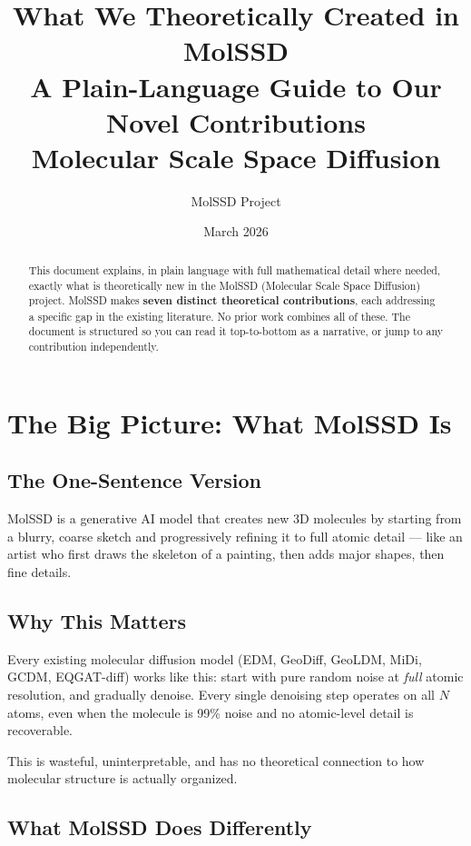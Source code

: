 \documentclass[12pt,a4paper]{article}
\title{%
  \vspace{-1cm}
  {\LARGE\textbf{What We Theoretically Created in MolSSD}}\\[0.5em]
  {\large A Plain-Language Guide to Our Novel Contributions}\\[0.3em]
  {\normalsize Molecular Scale Space Diffusion}
}
\author{MolSSD Project}
\date{March 2026}
\begin{document}
\maketitle

\begin{abstract}
This document explains, in plain language with full mathematical detail where needed, exactly what is theoretically new in the MolSSD (Molecular Scale Space Diffusion) project. MolSSD makes \textbf{seven distinct theoretical contributions}, each addressing a specific gap in the existing literature. No prior work combines all of these. The document is structured so you can read it top-to-bottom as a narrative, or jump to any contribution independently.
\end{abstract}

\tableofcontents
\newpage

\section{The Big Picture: What MolSSD Is}

\subsection{The One-Sentence Version}

MolSSD is a generative AI model that creates new 3D molecules by starting from a blurry, coarse sketch and progressively refining it to full atomic detail --- like an artist who first draws the skeleton of a painting, then adds major shapes, then fine details.

\subsection{Why This Matters}

Every existing molecular diffusion model (EDM, GeoDiff, GeoLDM, MiDi, GCDM, EQGAT-diff) works like this: start with pure random noise at \emph{full} atomic resolution, and gradually denoise. Every single denoising step operates on all $N$ atoms, even when the molecule is 99\% noise and no atomic-level detail is recoverable.

This is wasteful, uninterpretable, and has no theoretical connection to how molecular structure is actually organized.

\subsection{What MolSSD Does Differently}
\end{document}
